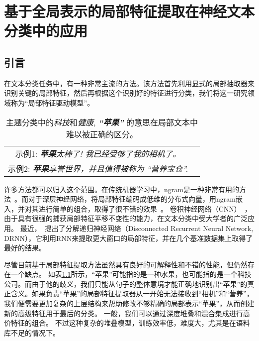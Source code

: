 \chapter{基于全局表示的局部特征提取在神经文本分类中的应用}

\section{引言}
在文本分类任务中，有一种非常主流的方法。该方法首先利用显式的局部抽取器来识别关键的局部特征，然后再根据这个识别好的特征进行分类，我们将这一研究领域称为``局部特征驱动模型''。

\begin{table}[t]
  \begin{center}
    \begin{tabular}{c c}
    \toprule
    示例1: \emph{\textbf{苹果}太棒了! 我已经受够了我的相机了。}\\
	示例2: \emph{\textbf{苹果}享誉世界，并且值得被称为 ``营养宝仓''.}\\
    \bottomrule
    \end{tabular}
  \end{center}
  \caption{主题分类中的\emph{科技}和\emph{健康}, \emph{\textbf{``苹果''}} 的意思在局部文本中难以被正确的区分。}
\label{tab: case}
\end{table}

许多方法都可以归入这个范围。在传统机器学习中，ngram是一种非常有用的方法~\citep{pang2002humbs, wang2012baselines}。而对于深层神经网络，将局部特征编码成低维的分布式向量，用ngram嵌入，并对其进行简单的组合，取得了很不错的效果~\citep{joulin2016bag, qiao2018anew}。
卷积神经网络（CNN）~\citep{lecun2010convolutional}，由于具有很强的捕获局部特征平移不变性的能力，在文本分类中受大学者的广泛应用。
最近，~提出了分解递归神经网络（Disconnected Recurrent Neural Network, DRNN），它利用RNN来提取更大窗口的局部特征，并在几个基准数据集上取得了最好的结果。

尽管目前基于局部特征提取方法虽然具有良好的可解释性和不错的性能，但仍然存在一个缺点。
如表\ref{tab: case}所示，``苹果''可能指的是一种水果，也可能指的是一个科技公司。而由于他的歧义，我们只能从句子的整体意境才能正确地识别出``苹果''的真正含义。如果负责``苹果''的局部特征提取器从一开始无法接收到``相机''和``营养''，我们便需要更加复杂的上层结构来帮助修改不够精确的局部表示``苹果''，从而创建新的高级特征用于最后的分类。
一般，我们可以通过深度堆叠\citep{Jords201201Dead,conneau2016very}和混合集成\citep{xiao2016efficient}进行高价特征的组合。
不过这种复杂的堆叠模型，训练效率低，难度大，尤其是在语料库不足的情况下。

